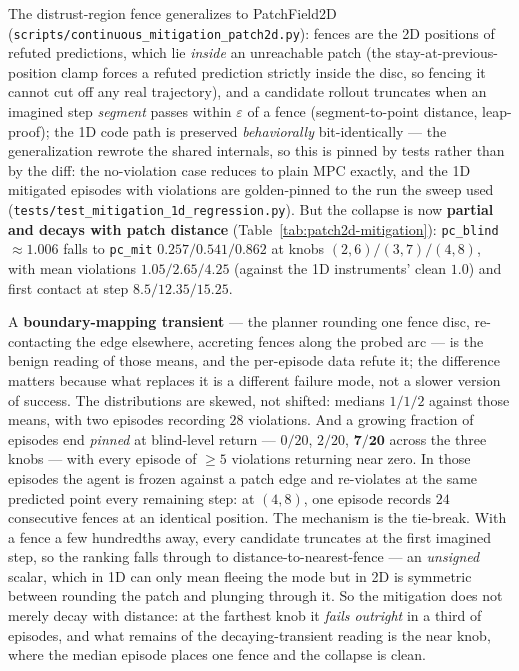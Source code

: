 \documentclass[11pt]{article}
\theoremstyle{definition}
\theoremstyle{remark}
\begin{document}
The distrust-region fence generalizes to PatchField2D (\texttt{scripts/\allowbreak continuous\_\allowbreak mitigation\_\allowbreak patch2d.py}): fences are the 2D positions of refuted predictions, which lie \emph{inside} an unreachable patch (the stay-at-previous-position clamp forces a refuted prediction strictly inside the disc, so fencing it cannot cut off any real trajectory), and a candidate rollout truncates when an imagined step \emph{segment} passes within $\varepsilon$ of a fence (segment-to-point distance, leap-proof); the 1D code path is preserved \emph{behaviorally} bit-identically --- the generalization rewrote the shared internals, so this is pinned by tests rather than by the diff: the no-violation case reduces to plain MPC exactly, and the 1D mitigated episodes with violations are golden-pinned to the run the sweep used (\texttt{tests/test\_mitigation\_1d\_regression.py}). But the collapse is now \textbf{partial and decays with patch distance} (Table~\ref{tab:patch2d-mitigation}): \texttt{pc\_blind} $\approx 1.006$ falls to \texttt{pc\_mit} $0.257 / 0.541 / 0.862$ at knobs $(2,6)/(3,7)/(4,8)$, with mean violations $1.05 / 2.65 / 4.25$ (against the 1D instruments' clean $1.0$) and first contact at step $8.5 / 12.35 / 15.25$.

A \textbf{boundary-mapping transient} --- the planner rounding one fence disc, re-contacting the edge elsewhere, accreting fences along the probed arc --- is the benign reading of those means, and the per-episode data refute it; the difference matters because what replaces it is a different failure mode, not a slower version of success. The distributions are skewed, not shifted: medians $1 / 1 / 2$ against those means, with two episodes recording $28$ violations. And a growing fraction of episodes end \emph{pinned} at blind-level return --- $0/20$, $2/20$, $\mathbf{7/20}$ across the three knobs --- with every episode of $\geq 5$ violations returning near zero. In those episodes the agent is frozen against a patch edge and re-violates at the same predicted point every remaining step: at $(4,8)$, one episode records $24$ consecutive fences at an identical position. The mechanism is the tie-break. With a fence a few hundredths away, every candidate truncates at the first imagined step, so the ranking falls through to distance-to-nearest-fence --- an \emph{unsigned} scalar, which in 1D can only mean fleeing the mode but in 2D is symmetric between rounding the patch and plunging through it. So the mitigation does not merely decay with distance: at the farthest knob it \emph{fails outright} in a third of episodes, and what remains of the decaying-transient reading is the near knob, where the median episode places one fence and the collapse is clean.
\end{document}
